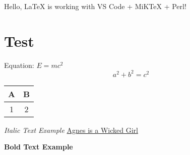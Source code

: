 \documentclass{article}
\begin{document}
Hello, LaTeX is working with VS Code + MiKTeX + Perl!

\section{Test}
Equation: \( E = mc^2 \)
\[
a^2 + b^2 = c^2
\]
\begin{tabular}{|c|c|}
\hline
A & B \\
\hline
1 & 2 \\
\hline
\end{tabular}


\textit{Italic Text Example}
\underline{Agnes is a Wicked Girl}




\textbf{Bold Text Example}
\end{document}
